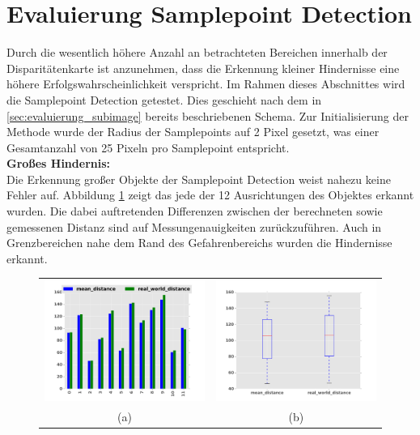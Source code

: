 \section{Evaluierung Samplepoint Detection}
\label{sec:evaluierung_samplepoint}

\noindent
Durch die wesentlich höhere Anzahl an betrachteten Bereichen innerhalb der Disparitätenkarte ist anzunehmen, dass die Erkennung kleiner Hindernisse eine höhere Erfolgswahrscheinlichkeit verspricht. Im Rahmen dieses Abschnittes wird die Samplepoint Detection getestet. Dies geschieht nach dem in \ref{sec:evaluierung_subimage} bereits beschriebenen Schema. Zur Initialisierung der Methode wurde der Radius der Samplepoints auf 2 Pixel gesetzt, was einer Gesamtanzahl von 25 Pixeln pro Samplepoint entspricht.\\

\noindent
\textbf{Großes Hindernis:}\\
Die Erkennung großer Objekte der Samplepoint Detection weist nahezu keine Fehler auf. Abbildung \ref{fig:sample_eval_big} zeigt das jede der 12 Ausrichtungen des Objektes erkannt wurden. Die dabei auftretenden Differenzen zwischen der berechneten sowie gemessenen Distanz sind auf Messungenauigkeiten zurückzuführen. Auch in Grenzbereichen nahe dem Rand des Gefahrenbereichs wurden die Hindernisse erkannt.\\

\begin{figure}[h]
	\centering
	\begin{tabular}{cc}
	\includegraphics[width=7cm]{img/evaluation/diagrams/sample_big_bar}&
	\includegraphics[width=7cm]{img/evaluation/diagrams/sample_big_box}\\
	 (a) & (b)
	\end{tabular}
	\caption{}
    \label{fig:sample_eval_big}
\end{figure}

